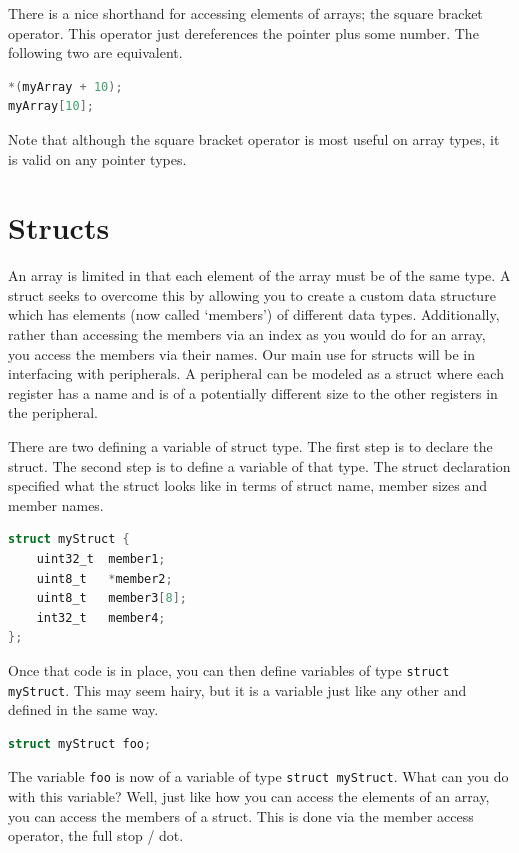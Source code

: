 There is a nice shorthand for accessing elements of arrays; the square bracket operator. This operator just dereferences the pointer plus some number. The following two are equivalent. 
\begin{lstlisting}[language=C]
*(myArray + 10);
myArray[10];
\end{lstlisting}

Note that although the square bracket operator is most useful on array types, it is valid on any pointer types. 

\section{Structs}
An array is limited in that each element of the array must be of the same type. A struct seeks to overcome this by allowing you to create a custom data structure which has elements (now called `members') of different data types. Additionally, rather than accessing the members via an index as you would do for an array, you access the members via their names. 
Our main use for structs will be in interfacing with peripherals.
A peripheral can be modeled as a struct where each register has a name and is of a potentially different size to the other registers in the peripheral.

There are two defining a variable of struct type.
The first step is to declare the struct. The second step is to define a variable of that type.
The struct declaration specified what the struct looks like in terms of struct name, member sizes and member names.

\begin{lstlisting}[language=C]
struct myStruct {
    uint32_t  member1;
    uint8_t   *member2;
    uint8_t   member3[8];
    int32_t   member4; 
};
\end{lstlisting}

Once that code is in place, you can then define variables of type \texttt{struct myStruct}. This may seem hairy, but it is a variable just like any other and defined in the same way.

\begin{lstlisting}[language=C]
struct myStruct foo;
\end{lstlisting}

The variable \texttt{foo} is now of a variable of type \texttt{struct myStruct}. What can you do with this variable? Well, just like how you can access the elements of an array, you can access the members of a struct. This is done via the member access operator, the full stop / dot. 

